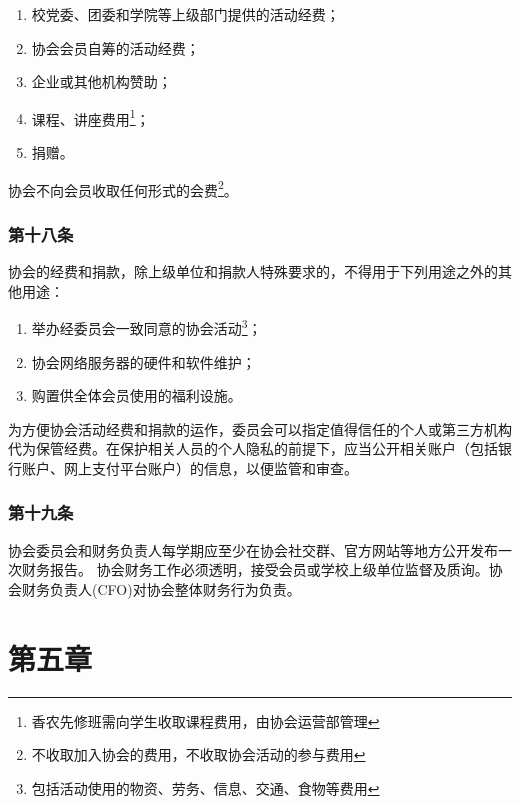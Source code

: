 \documentclass[
]{ctexart}
\begin{document}
\begin{enumerate}
\def\labelenumi{\arabic{enumi}.}
\item
  校党委、团委和学院等上级部门提供的活动经费；
\item
  协会会员自筹的活动经费；
\item
  企业或其他机构赞助；
\item
  课程、讲座费用\footnote{香农先修班需向学生收取课程费用，由协会运营部管理}；
\item
  捐赠。
\end{enumerate}

协会不向会员收取任何形式的会费\footnote{不收取加入协会的费用，不收取协会活动的参与费用}。

\hypertarget{ux7b2cux5341ux516bux6761-ux7ecfux8d39ux8fd0ux7528}{%
\subsubsection{第十八条}\label{ux7b2cux5341ux516bux6761-ux7ecfux8d39ux8fd0ux7528}}

协会的经费和捐款，除上级单位和捐款人特殊要求的，不得用于下列用途之外的其他用途：

\begin{enumerate}
\def\labelenumi{\arabic{enumi}.}
\item
  举办经委员会一致同意的协会活动\footnote{包括活动使用的物资、劳务、信息、交通、食物等费用}；
\item
  协会网络服务器的硬件和软件维护；
\item
  购置供全体会员使用的福利设施。
\end{enumerate}

为方便协会活动经费和捐款的运作，委员会可以指定值得信任的个人或第三方机构代为保管经费。在保护相关人员的个人隐私的前提下，应当公开相关账户（包括银行账户、网上支付平台账户）的信息，以便监管和审查。

\hypertarget{ux7b2cux5341ux4e5dux6761-ux8d22ux52a1ux62a5ux544a}{%
\subsubsection{第十九条}\label{ux7b2cux5341ux4e5dux6761-ux8d22ux52a1ux62a5ux544a}}

协会委员会和财务负责人每学期应至少在协会社交群、官方网站等地方公开发布一次财务报告。
协会财务工作必须透明，接受会员或学校上级单位监督及质询。协会财务负责人(CFO)对协会整体财务行为负责。

\hypertarget{ux7b2cux4e94ux7ae0-ux534fux4f1aux7ae0ux7a0b}{%
\section{第五章}\label{ux7b2cux4e94ux7ae0-ux534fux4f1aux7ae0ux7a0b}}
\end{document}
